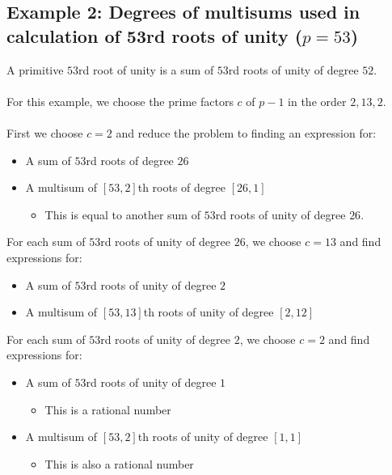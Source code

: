 \documentclass{article}
\begin{document}
    \subsection{Example 2: Degrees of multisums used in calculation of 53rd roots of unity ($ p = 53 $)}
        A primitive $ 53 $rd root of unity is a sum of $ 53 $rd roots of unity of degree $ 52 $.\\
        \\
        For this example, we choose the prime factors $ c $ of $ p - 1 $ in the order $ 2, 13, 2 $.\\
        \\
        First we choose $ c = 2 $ and reduce the problem to finding an expression for:
        \begin{itemize}
            \item A sum of $ 53 $rd roots of degree $ 26 $
            \item A multisum of $ [53, 2] $th roots of degree $ [26, 1] $
            \begin{itemize}
                \item This is equal to another sum of $ 53 $rd roots of unity of degree $ 26 $.
            \end{itemize}
        \end{itemize}
        For each sum of $ 53 $rd roots of unity of degree $ 26 $, we choose $ c = 13 $ and find expressions for:
        \begin{itemize}
            \item A sum of $ 53 $rd roots of unity of degree $ 2 $
            \item A multisum of $ [53, 13] $th roots of unity of degree $ [2, 12] $
        \end{itemize}
        For each sum of $ 53 $rd roots of unity of degree $ 2 $, we choose $ c = 2 $ and find expressions for:
        \begin{itemize}
            \item A sum of $ 53 $rd roots of unity of degree $ 1 $
            \begin{itemize}
                \item This is a rational number
            \end{itemize}
            \item A multisum of $ [53, 2] $th roots of unity of degree $ [1, 1] $
            \begin{itemize}
                \item This is also a rational number
            \end{itemize}
        \end{itemize}
\end{document}
